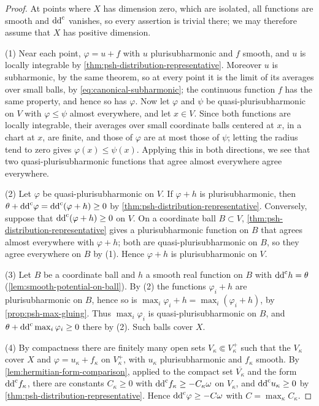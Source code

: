 \begin{proof}
At points where $X$ has dimension zero, which are isolated, all functions are smooth and $\mathrm{dd}^{\mathrm{c}}$ vanishes, so every assertion is trivial there; we may therefore assume that $X$ has positive dimension.

(1) Near each point, $\varphi=u+f$ with $u$ plurisubharmonic and $f$ smooth, and $u$ is locally integrable by \cref{thm:psh-distribution-representative}. Moreover $u$ is subharmonic, by the same theorem, so at every point it is the limit of its averages over small balls, by \eqref{eq:canonical-subharmonic}; the continuous function $f$ has the same property, and hence so has $\varphi$. Now let $\varphi$ and $\psi$ be quasi-plurisubharmonic on $V$ with $\varphi\leq\psi$ almost everywhere, and let $x\in V$. Since both functions are locally integrable, their averages over small coordinate balls centered at $x$, in a chart at $x$, are finite, and those of $\varphi$ are at most those of $\psi$; letting the radius tend to zero gives $\varphi(x)\leq\psi(x)$. Applying this in both directions, we see that two quasi-plurisubharmonic functions that agree almost everywhere agree everywhere.

(2) Let $\varphi$ be quasi-plurisubharmonic on $V$. If $\varphi+h$ is plurisubharmonic, then $\theta+\mathrm{dd}^{\mathrm{c}}\varphi=\mathrm{dd}^{\mathrm{c}}(\varphi+h)\geq0$ by \cref{thm:psh-distribution-representative}. Conversely, suppose that $\mathrm{dd}^{\mathrm{c}}(\varphi+h)\geq0$ on $V$. On a coordinate ball $B\subset V$, \cref{thm:psh-distribution-representative} gives a plurisubharmonic function on $B$ that agrees almost everywhere with $\varphi+h$; both are quasi-plurisubharmonic on $B$, so they agree everywhere on $B$ by (1). Hence $\varphi+h$ is plurisubharmonic on $V$.

(3) Let $B$ be a coordinate ball and $h$ a smooth real function on $B$ with $\mathrm{dd}^{\mathrm{c}} h=\theta$ (\cref{lem:smooth-potential-on-ball}). By (2) the functions $\varphi_i+h$ are plurisubharmonic on $B$, hence so is $\max_i\varphi_i+h=\max_i(\varphi_i+h)$, by \cref{prop:psh-max-gluing}. Thus $\max_i\varphi_i$ is quasi-plurisubharmonic on $B$, and $\theta+\mathrm{dd}^{\mathrm{c}}\max_i\varphi_i\geq0$ there by (2). Such balls cover $X$.

(4) By compactness there are finitely many open sets $V_\kappa\Subset V_\kappa^+$ such that the $V_\kappa$ cover $X$ and $\varphi=u_\kappa+f_\kappa$ on $V_\kappa^+$, with $u_\kappa$ plurisubharmonic and $f_\kappa$ smooth. By \cref{lem:hermitian-form-comparison}, applied to the compact set $\overline{V_\kappa}$ and the form $\mathrm{dd}^{\mathrm{c}} f_\kappa$, there are constants $C_\kappa\geq0$ with $\mathrm{dd}^{\mathrm{c}} f_\kappa\geq-C_\kappa\omega$ on $V_\kappa$, and $\mathrm{dd}^{\mathrm{c}} u_\kappa\geq0$ by \cref{thm:psh-distribution-representative}. Hence $\mathrm{dd}^{\mathrm{c}}\varphi\geq-C\omega$ with $C=\max_\kappa C_\kappa$.


\end{proof}
